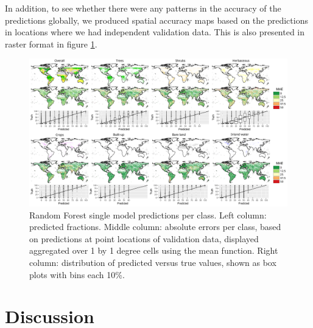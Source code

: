 \documentclass[review,authoryear,3p]{elsarticle}
\begin{document}

In addition, to see whether there were any patterns in the accuracy of the predictions globally, we produced spatial accuracy maps based on the predictions in locations where we had independent validation data.
This is also presented in raster format in figure \ref{fig-walltowall}.

\begin{figure}
    \centering
    \includegraphics[width=\textwidth]{article/article-figures/maps/2020-06-19-walltowall.png}
    \caption{Random Forest single model predictions per class. Left column: predicted fractions. Middle column: absolute errors per class, based on predictions at point locations of validation data, displayed aggregated over 1 by 1 degree cells using the mean function. Right column: distribution of predicted versus true values, shown as box plots with bins each 10\%.}
    \label{fig-walltowall}
\end{figure}

\section{Discussion}
\end{document}

